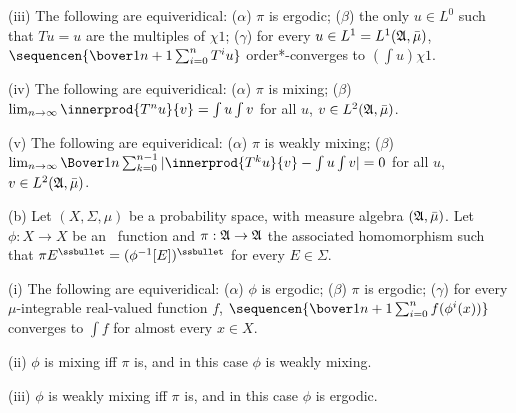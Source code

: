 \quad(iii) The following
are equiveridical:  ($\alpha$) $\pi$ is
ergodic;  ($\beta$) the only $u\in L^0$ such that $Tu=u$ are the
multiples of
$\chi 1$;   ($\gamma$) for every $u\in L^1=L^1(\frak A,\bar\mu)$,
$\sequencen{\bover1{n+1}\sum_{i=0}^nT^iu}$ order*-converges to
$(\int u)\chi 1$.

\quad(iv)
The following are equiveridical:  ($\alpha$) $\pi$ is mixing;
($\beta$) $\lim_{n\to\infty}\innerprod{T^nu}{v}=\int u\int v$ for all $u$,
$v\in L^2(\frak A,\bar\mu)$.

\quad(v)
The following are equiveridical:  ($\alpha$) $\pi$ is weakly mixing;
($\beta$)
$\lim_{n\to\infty}\Bover1n\sum_{k=0}^{n-1}
  |\innerprod{T^ku}{v}-\int u\int v|=0$ for all $u$,
$v\in L^2(\frak A,\bar\mu)$.

(b) Let $(X,\Sigma,\mu)$ be a probability space, with measure algebra
$(\frak A,\bar\mu)$.   Let $\phi:X\to X$ be an \imp\ function and
$\pi:\frak A\to\frak A$ the associated homomorphism such that
$\pi E^{\ssbullet}=(\phi^{-1}[E])^{\ssbullet}$ for every $E\in\Sigma$.

\quad (i) The following are equiveridical:  ($\alpha$) $\phi$ is
ergodic;
($\beta$) $\pi$ is ergodic;  ($\gamma$) for every $\mu$-integrable
real-valued function $f$,
$\sequencen{\bover1{n+1}\sum_{i=0}^nf(\phi^i(x))}$ converges to $\int f$
for almost every $x\in X$.

\quad (ii) $\phi$ is mixing iff $\pi$ is, and in this case $\phi$ is
weakly mixing.

\quad (iii) $\phi$ is weakly mixing iff $\pi$ is, and in this case $\phi$
is ergodic.

